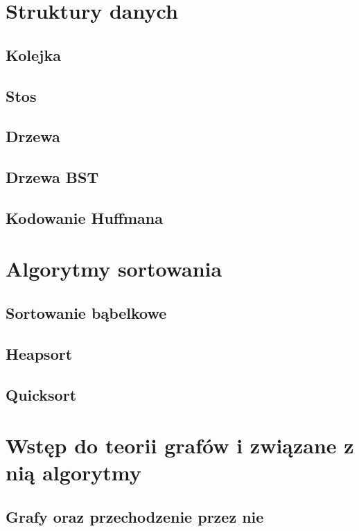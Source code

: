 \documentclass[10pt, oneside]{article}
\theoremstyle{remark}
\begin{document}
\section{Struktury danych}
\subsection{Kolejka}

\subsection{Stos}

\subsection{Drzewa}

\subsection{Drzewa BST}

\subsection{Kodowanie Huffmana}


\section{Algorytmy sortowania}

\subsection{Sortowanie bąbelkowe}

\subsection{Heapsort}

\subsection{Quicksort}

\section{Wstęp do teorii grafów i związane z nią algorytmy}
\subsection{Grafy oraz przechodzenie przez nie}
\end{document}
